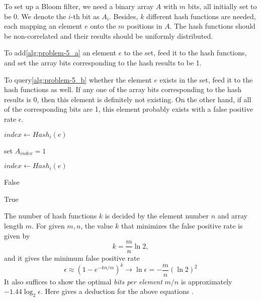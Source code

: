 \documentclass[catalog.tex]{subfiles}
\begin{document}
To set up a Bloom filter, we need a binary array $A$ with $m$ bits, all initially set to be 0. We denote the $i$-th bit as $A_i$. Besides, $k$ different hash functions are needed, each mapping an element $e$ onto the $m$ positions in $A$. The hash functions should be non-correlated and their results should be uniformly distributed. 

To add\ref{alg:problem-5_a} an element $e$ to the set, feed it to the hash functions, and set the array bits corresponding to the hash results to be 1.

To query\ref{alg:problem-5_b} whether the element $e$ exists in the set, feed it to the hash functions as well. If any one of the array bits corresponding to the hash results is 0, then this element is definitely not existing. On the other hand, if all of the corresponding bits are 1, this element probably exists with a false positive rate $\epsilon$.

\begin{Algorithm}[Add new element\label{alg:\currfilebase_a},htbp]
    {
        $index \gets Hash_i(e)$

        set $A_{index} = 1$
    }


\end{Algorithm}

\begin{Algorithm}[Query\label{alg:\currfilebase_b},htbp]
    {
        $index \gets Hash_i(e)$

        {
            \Ret False
        }
    }
	\BlankLine

	\Ret True

\end{Algorithm}

The number of hash functions $k$ is decided by the element number $n$ and array length $m$. For given $m, n$, the value $k$ that minimizes the false positive rate is given by
$$
k = \frac{m}{n}\ln 2,
$$
and it gives the minimum false positive rate
$$
\epsilon \approx \left(1-e^{-kn/m}\right)^k \rightarrow \ln \epsilon=-\frac{m}{n}(\ln 2)^2
$$
It also suffices to show the optimal \textit{bits per element} $m/n$ is approximately $-1.44\log_2\epsilon$. Here gives a deduction for the above equations \cite{kumar}.
\end{document}

